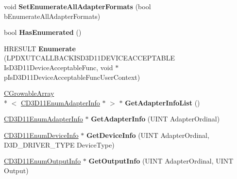 \begin{DoxyCompactItemize}
\item 
\hypertarget{class_c_d3_d11_enumeration_affa445284ba3536da95d675f4b63630a}{void {\bfseries Set\+Enumerate\+All\+Adapter\+Formats} (bool b\+Enumerate\+All\+Adapter\+Formats)}\label{class_c_d3_d11_enumeration_affa445284ba3536da95d675f4b63630a}

\item 
\hypertarget{class_c_d3_d11_enumeration_a66298015c078b99ecf2598a615826631}{bool {\bfseries Has\+Enumerated} ()}\label{class_c_d3_d11_enumeration_a66298015c078b99ecf2598a615826631}

\item 
\hypertarget{class_c_d3_d11_enumeration_a20b8d7b6211cc280236c760abca5aff4}{H\+R\+E\+S\+U\+L\+T {\bfseries Enumerate} (L\+P\+D\+X\+U\+T\+C\+A\+L\+L\+B\+A\+C\+K\+I\+S\+D3\+D11\+D\+E\+V\+I\+C\+E\+A\+C\+C\+E\+P\+T\+A\+B\+L\+E Is\+D3\+D11\+Device\+Acceptable\+Func, void $\ast$p\+Is\+D3\+D11\+Device\+Acceptable\+Func\+User\+Context)}\label{class_c_d3_d11_enumeration_a20b8d7b6211cc280236c760abca5aff4}

\item 
\hypertarget{class_c_d3_d11_enumeration_a888c4663061cc4b2cff3ea2d08c62b64}{\hyperlink{class_c_growable_array}{C\+Growable\+Array}\\*
$<$ \hyperlink{class_c_d3_d11_enum_adapter_info}{C\+D3\+D11\+Enum\+Adapter\+Info} $\ast$ $>$ $\ast$ {\bfseries Get\+Adapter\+Info\+List} ()}\label{class_c_d3_d11_enumeration_a888c4663061cc4b2cff3ea2d08c62b64}

\item 
\hypertarget{class_c_d3_d11_enumeration_ace8e4ec27a922bb41e3e02a39f0cd943}{\hyperlink{class_c_d3_d11_enum_adapter_info}{C\+D3\+D11\+Enum\+Adapter\+Info} $\ast$ {\bfseries Get\+Adapter\+Info} (U\+I\+N\+T Adapter\+Ordinal)}\label{class_c_d3_d11_enumeration_ace8e4ec27a922bb41e3e02a39f0cd943}

\item 
\hypertarget{class_c_d3_d11_enumeration_aea18792adab4e9f800e6bfa90d0ed29f}{\hyperlink{class_c_d3_d11_enum_device_info}{C\+D3\+D11\+Enum\+Device\+Info} $\ast$ {\bfseries Get\+Device\+Info} (U\+I\+N\+T Adapter\+Ordinal, D3\+D\+\_\+\+D\+R\+I\+V\+E\+R\+\_\+\+T\+Y\+P\+E Device\+Type)}\label{class_c_d3_d11_enumeration_aea18792adab4e9f800e6bfa90d0ed29f}

\item 
\hypertarget{class_c_d3_d11_enumeration_abe639d5112cb80933bdc9b32c4217528}{\hyperlink{class_c_d3_d11_enum_output_info}{C\+D3\+D11\+Enum\+Output\+Info} $\ast$ {\bfseries Get\+Output\+Info} (U\+I\+N\+T Adapter\+Ordinal, U\+I\+N\+T Output)}\label{class_c_d3_d11_enumeration_abe639d5112cb80933bdc9b32c4217528}


\end{DoxyCompactItemize}
